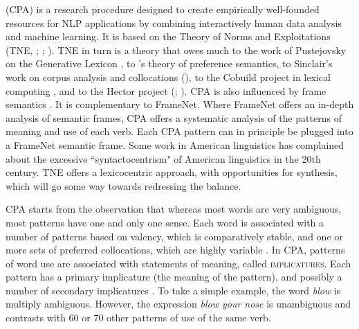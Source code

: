 \documentclass[output=paper]{langsci/langscibook}
\begin{document}
  (CPA) is a research procedure designed to create
empirically well-founded resources for NLP applications by combining
interactively human data analysis and machine learning. It is based on
the Theory of Norms and Exploitations (TNE, \citealt{hankspustejovsky2004}; \citealt{hanks2005}; \citealt{hanks2013}). 
TNE in turn is a theory that owes much to the
work of Pustejovsky on the Generative Lexicon \citep{pustejovsky1995},
 to \cite{wilks1975}'s theory of preference semantics,
 to
Sinclair's work on corpus analysis and collocations (\citealt{Sinclair:66, sinclair1987, Sinclair:1991, sinclair2004}),
to the Cobuild project in lexical computing \citep{sinclair1987}, 
and to the Hector project (\citealt{atkins1992}; \citealt{hanks1994}).
CPA is also influenced by frame semantics \citep{Fillmore1992risk}. 
It is complementary
to FrameNet.
Where FrameNet
offers an in-depth analysis of semantic frames, CPA offers a systematic
analysis of the patterns of meaning and use of each verb. Each CPA
pattern can in principle be plugged into a FrameNet semantic frame. Some
work in American linguistics \citep{jackendoff2002foundation}  has complained
about the excessive ``syntactocentrism" of American linguistics in the
20th century. TNE offers a lexicocentric approach, with opportunities
for synthesis, which will go some way towards redressing the balance.



CPA starts from the observation that whereas most words are very
ambiguous, most patterns have one and only one sense. Each word is
associated with a number of patterns based on valency, which is
comparatively stable, and one or more sets of preferred collocations,
which are highly variable \citep{hanks2012}.  In CPA, patterns of word use
are associated with statements of meaning, called \textsc{implicatures}. Each
pattern has a primary implicature (the meaning of the pattern), and
possibly a number of secondary implicatures \citep{deschryver2010}. To
take a simple example, the word \textit{blow} is multiply ambiguous. However,
the expression  \textit{blow your nose} is unambiguous and contrasts with 60 or
70 other patterns of use of the same verb.
\end{document}
